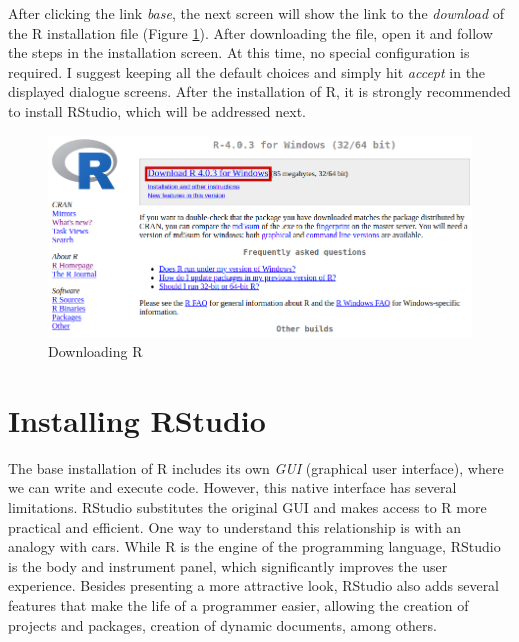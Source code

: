 \documentclass[
  12pt,
]{book}
\begin{document}
After clicking the link \emph{base}, the next screen will show the link to the \emph{download} of the R installation file (Figure \ref{fig:website-cran-5}). After downloading the file, open it and follow the steps in the installation screen. At this time, no special configuration is required. I suggest keeping all the default choices and simply hit \emph{accept} in the displayed dialogue screens. After the installation of R, it is strongly recommended to install RStudio, which will be addressed next.

\begin{figure}[!htbp]

{\centering \includegraphics[width=1\linewidth]{figs/website_cran_5} 

}

\caption{Downloading R}\label{fig:website-cran-5}
\end{figure}

\hypertarget{installing-rstudio}{%
\section{Installing RStudio}\label{installing-rstudio}}

The base installation of R includes its own \emph{GUI} (graphical user interface), where we can write and execute code. However, this native interface has several limitations. RStudio substitutes the original GUI and makes access to R more practical and efficient. One way to understand this relationship is with an analogy with cars. While R is the engine of the programming language, RStudio is the body and instrument panel, which significantly improves the user experience. Besides presenting a more attractive look, RStudio also adds several features that make the life of a programmer easier, allowing the creation of projects and packages, creation of dynamic documents, among others. 
\end{document}

